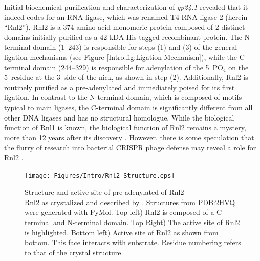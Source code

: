     Initial biochemical purification and characterization of \textit{gp24.1} \citep{Ho2002b} revealed that it indeed codes for an RNA ligase, which was renamed T4 RNA ligase 2 (herein ``Rnl2''). Rnl2 is a 374 amino acid monomeric protein composed of 2 distinct domains initially purified as a 42-kDA His-tagged recombinant protein. The N-terminal domain (1--243) is responsible for steps (1) and (3) of the general ligation mechanisms (see Figure \ref{Intro:fig:Ligation Mechanism}), while the C-terminal domain (244--329) is responsible for adenylation of the 5\textprime~PO$_{4}$ on the 5\textprime~residue at the 3\textprime~side of the nick, as shown in step (2). Additionally, Rnl2 is routinely purified as a pre-adenylated and immediately poised for its first ligation. In contrast to the N-terminal domain, which is composed of motifs typical to main ligases, the C-terminal domain is significantly  different from all other DNA ligases and has no structural homologue. While the biological function of Rnl1 is known, the biological function of Rnl2 remains a mystery, more than 12 years after its discovery \citep{Chauleau2013b}. However, there is some speculation that the flurry of research into bacterial CRISPR phage defense may reveal a role for Rnl2 \citep{Barrangou2007c,Chauleau2013b}.

    \begin{figure} %
      \centering 
      \texttt{[image: Figures/Intro/Rnl2\_Structure.eps]}
      \caption[Structure and active site of pre-adenylated of Rnl2]
      {
        Structure and active site of pre-adenylated of Rnl2\\[0.25cm]
        Rnl2 as crystalized and described by \citep{Nandakumar2006}. Structures from PDB:2HVQ were generated with PyMol. Top left) Rnl2 is composed of a C-terminal and N-terminal domain. Top Right) The active site of Rnl2 is highlighted. Bottom left) Active site of Rnl2 as shown from bottom. This face interacts with substrate. Residue numbering refers to that of the crystal structure.
        }
      \label{Intro:fig:Rnl2 General Structure}
      \end{figure}

